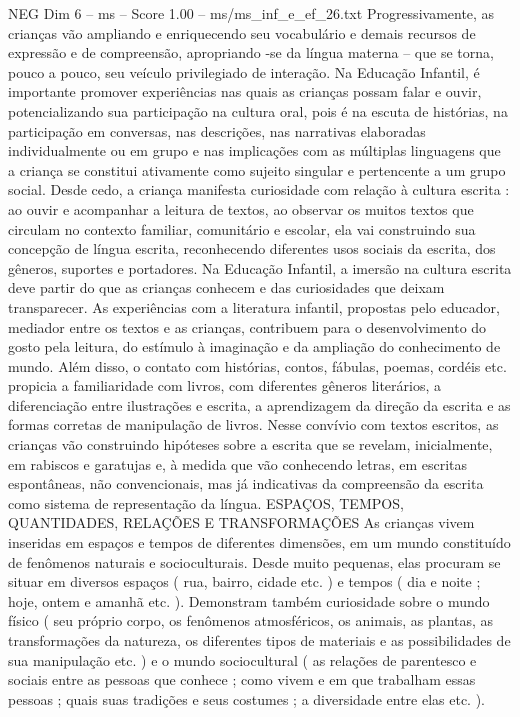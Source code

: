 \begin{textsample}{NEG Dim 6 – ms – Score 1.00 – ms/ms\_inf\_e\_ef\_26.txt}
Progressivamente, as crianças vão ampliando e enriquecendo seu vocabulário e demais recursos de expressão e de compreensão, apropriando -se da língua materna – que se torna, pouco a pouco, seu veículo privilegiado de interação.
Na Educação Infantil, é importante promover experiências nas quais as crianças possam falar e ouvir, potencializando sua participação na cultura oral, pois é na escuta de histórias, na participação em conversas, nas descrições, nas narrativas elaboradas individualmente ou em grupo e nas implicações com as múltiplas linguagens que a criança se constitui ativamente como sujeito singular e pertencente a um grupo social.
Desde cedo, a criança manifesta curiosidade com relação à cultura escrita : ao ouvir e acompanhar a leitura de textos, ao observar os muitos textos que circulam no contexto familiar, comunitário e escolar, ela vai construindo sua concepção de língua escrita, reconhecendo diferentes usos sociais da escrita, dos gêneros, suportes e portadores.
Na Educação Infantil, a imersão na cultura escrita deve partir do que as crianças conhecem e das curiosidades que deixam transparecer.
As experiências com a literatura infantil, propostas pelo educador, mediador entre os textos e as crianças, contribuem para o desenvolvimento do gosto pela leitura, do estímulo à imaginação e da ampliação do conhecimento de mundo.
Além disso, o contato com histórias, contos, fábulas, poemas, cordéis etc. propicia a familiaridade com livros, com diferentes gêneros literários, a diferenciação entre ilustrações e escrita, a aprendizagem da direção da escrita e as formas corretas de manipulação de livros.
Nesse convívio com textos escritos, as crianças vão construindo hipóteses sobre a escrita que se revelam, inicialmente, em rabiscos e garatujas e, à medida que vão conhecendo letras, em escritas espontâneas, não convencionais, mas já indicativas da compreensão da escrita como sistema de representação da língua.
ESPAÇOS, TEMPOS, QUANTIDADES, RELAÇÕES E TRANSFORMAÇÕES As crianças vivem inseridas em espaços e tempos de diferentes dimensões, em um mundo constituído de fenômenos naturais e socioculturais.
Desde muito pequenas, elas procuram se situar em diversos espaços ( rua, bairro, cidade etc. ) e tempos ( dia e noite ; hoje, ontem e amanhã etc. ).
Demonstram também curiosidade sobre o mundo físico ( seu próprio corpo, os fenômenos atmosféricos, os animais, as plantas, as transformações da natureza, os diferentes tipos de materiais e as possibilidades de sua manipulação etc. ) e o mundo sociocultural ( as relações de parentesco e sociais entre as pessoas que conhece ; como vivem e em que trabalham essas pessoas ; quais suas tradições e seus costumes ; a diversidade entre elas etc. ).

\end{textsample}
